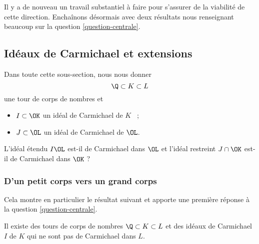 \vspace{1em}
\begin{algorithm}[H]\label{algo-quadratique-faible}
\end{algorithm}
\vspace{1em}

Il y a de nouveau un travail substantiel à faire pour s'assurer de la viabilité de cette direction. Enchaînons désormais avec deux résultats nous renseignant beaucoup sur la question \ref{question-centrale}.

\subsection{Idéaux de Carmichael et extensions}

Dans toute cette sous-section, nous nous donner $$\Q\subset K \subset L$$ une tour de corps de nombres et \begin{itemize}
	\item $I\subset \OK$ un idéal de Carmichael de $K$ ~;
	\item $J \subset \OL$ un idéal de Carmichael de $\OL$.
\end{itemize}

\begin{question}
	L'idéal étendu $I\OL$ est-il de Carmichael dans $\OL$ et l'idéal restreint $J\cap\OK$ est-il de Carmichael dans $\OK$ ?
\end{question}

\subsubsection{D'un petit corps vers un grand corps}

Cela montre en particulier le résultat suivant et apporte une première réponse à la question \ref{question-centrale}.

\begin{proposition}\label{premier-ce}
	Il existe des tours de corps de nombres $\Q\subset K \subset L$ et des idéaux de Carmichael $I$ de $K$ qui ne sont pas de Carmichael dans $L$.
\end{proposition}

